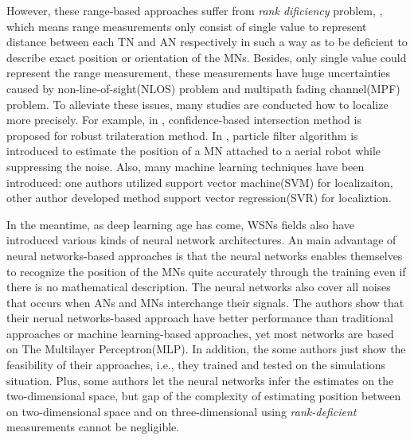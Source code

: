 \documentclass{ieeeaccess}
\begin{document}
However, these range-based approaches suffer from \textit{rank dificiency} problem, \cite{fabresse2018efficient}, which means range measurements only consist of single value to represent distance between each TN and AN respectively in such a way as to be deficient to describe exact position or orientation of the MNs. Besides, only single value could represent the range measurement, these measurements have huge uncertainties caused by non-line-of-sight(NLOS) problem and multipath fading channel(MPF) problem\cite{li2017novel}. To alleviate these issues, many studies are conducted how to localize more precisely. For example, in \cite{li2017novel}, confidence-based intersection method is proposed for robust trilateration method. In \cite{caballero2008particle}, particle filter algorithm is introduced to estimate the position of a MN attached to a aerial robot while suppressing the noise. Also, many machine learning techniques have been introduced: one authors utilized support vector machine(SVM) for localizaiton\cite{tran2008localization, huan2010three, feng2012determination, afzal2014localization}, other author developed method support vector regression(SVR) for localiztion\cite{lee2013new, lee2013novel}. 

In the meantime, as deep learning age has come\cite{lecun2015deep}, WSNs fields also have introduced various kinds of neural network architectures\cite{rahman2009localization, singh2013tdoa, abdelhadi2013efficient, kumar2016localization, banihashemian2018new}. An main advantage of neural networks-based approaches is that the neural networks enables themselves to recognize the position of the MNs quite accurately through the training even if there is no mathematical description. The neural networks also cover all noises that occurs when ANs and MNs interchange their signals. The authors show that their nerual networks-based approach have better performance than traditional approaches or machine learning-based approaches, yet most networks are based on The Multilayer Perceptron(MLP). In addition, the some authors just show the feasibility of their approaches, i.e., they trained and tested on the simulations situation. Plus, some authors let the neural networks infer the estimates on the two-dimensional space, but gap of the complexity of estimating position between on two-dimensional space and on three-dimensional using \textit{rank-deficient} measurements cannot be negligible.
\end{document}
